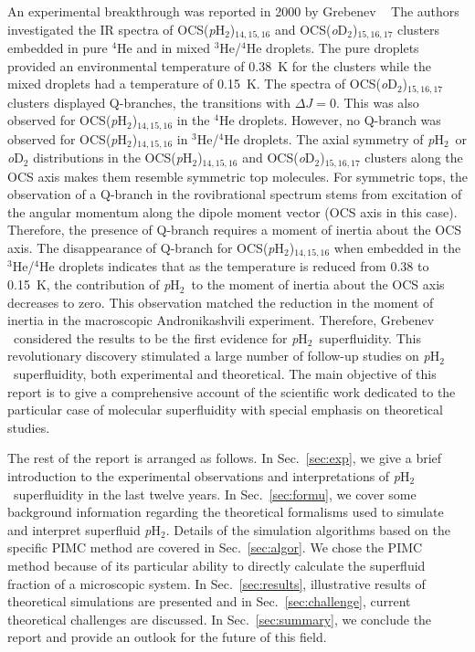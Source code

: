 \documentclass[12pt]{iopart}
\newcommand{\phtwo}{{\em p}H$_2$}
\begin{document}
An experimental breakthrough was reported in 2000 by Grebenev \etal~\cite{grebenev_OCS_pH2} The authors investigated the IR spectra of OCS(\phtwo)$_{14,15,16}$ and OCS({\em o}D$_2$)$_{15,16,17}$ clusters embedded in pure $^4$He and in mixed $^3$He/$^4$He droplets. The pure droplets provided an environmental temperature of 0.38~K for the clusters while the mixed droplets had a temperature of 0.15~K. The spectra of OCS({\em o}D$_2$)$_{15,16,17}$ clusters displayed Q-branches, the transitions with $\Delta J=0$. This was also observed for OCS(\phtwo)$_{14,15,16}$ in the $^4$He droplets. However, no Q-branch was observed for OCS(\phtwo)$_{14,15,16}$ in $^3$He/$^4$He droplets.
The axial symmetry of \phtwo~or {\em o}D$_2$ distributions in the OCS(\phtwo)$_{14,15,16}$ and OCS({\em o}D$_2$)$_{15,16,17}$ clusters along the OCS axis makes them resemble symmetric top molecules. For symmetric tops, the observation of a Q-branch in the rovibrational spectrum stems from excitation of the angular momentum along the dipole moment vector (OCS axis in this case).
Therefore, the presence of Q-branch requires a moment of inertia about the OCS axis. The disappearance of Q-branch for OCS(\phtwo)$_{14,15,16}$ when embedded in the $^3$He/$^4$He droplets indicates that as the temperature is reduced from 0.38 to 0.15~K, the contribution of \phtwo~to the moment of inertia about the OCS axis decreases to zero. This observation matched the reduction in the moment of inertia in the macroscopic Andronikashvili experiment. 
Therefore, Grebenev \etal~considered the results to be the first evidence for \phtwo~superfluidity. 
This revolutionary discovery stimulated a large number of follow-up studies on \phtwo~superfluidity, both experimental and theoretical. 
The main objective of this report is to give a comprehensive account of the scientific work dedicated to the particular case of molecular superfluidity with special emphasis on theoretical studies.

The rest of the report is arranged as follows. In Sec.~\ref{sec:exp}, we give a brief introduction to the experimental observations and interpretations of \phtwo~superfluidity in the last twelve years. In Sec.~\ref{sec:formu}, we cover some background information regarding  the theoretical formalisms  used to  simulate and interpret superfluid \phtwo. Details of the simulation algorithms based on the specific PIMC method are covered in Sec.~\ref{sec:algor}. 
We chose the PIMC method because of its particular ability to directly calculate the superfluid fraction of a microscopic system. 
In Sec.~\ref{sec:results}, illustrative results of theoretical simulations are presented and in Sec.~\ref{sec:challenge}, current theoretical challenges are discussed. 
In Sec.~\ref{sec:summary}, we conclude the report and provide an outlook for the future of this field.
\end{document}
